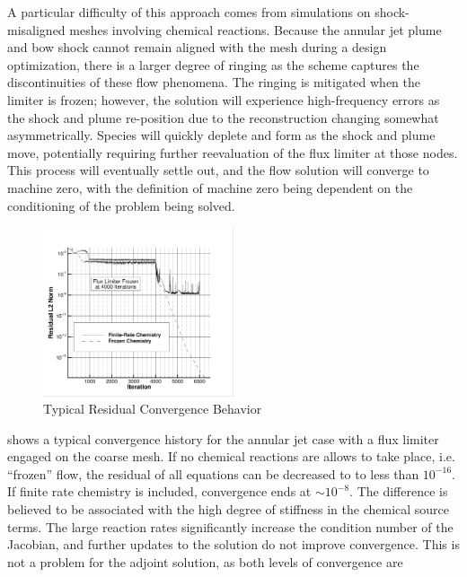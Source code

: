A particular difficulty of this approach comes from simulations on
shock-misaligned meshes involving chemical reactions.  Because the annular jet
plume and bow shock cannot remain aligned with the mesh during a design
optimization, there is a larger degree of ringing as the scheme captures the
discontinuities of these flow phenomena.  The ringing is mitigated when the
limiter is frozen; however, the solution will experience high-frequency errors
as the shock and plume re-position due to the reconstruction changing somewhat
asymmetrically.  Species will quickly deplete and form as the shock and plume
move, potentially requiring further reevaluation of the flux limiter at those
nodes.  This process will eventually settle out, and the flow solution will
converge to machine zero, with the definition of machine zero being dependent on
the conditioning of the problem being solved.  
\begin{figure}[h]
  \centering
  \includegraphics[width=0.5\textwidth]{figures/limiters/chem-res-comp.png}
  \caption{Typical Residual Convergence Behavior}
  \label{fig:chem-res-comp}
\end{figure}
 shows a typical convergence history for the annular jet
case with a flux limiter engaged on the coarse mesh.  If no chemical reactions
are allows to take place, i.e. ``frozen'' flow, the residual of all equations
can be decreased to to less than $10^{-16}$.  If finite rate chemistry is
included, convergence ends at $\sim 10^{-8}$.  The difference is believed to be
associated with the high degree of stiffness in the chemical source terms.  The
large reaction rates significantly increase the condition number of the
Jacobian, and further updates to the solution do not improve convergence.  This
is not a problem for the adjoint solution, as both levels of convergence are
